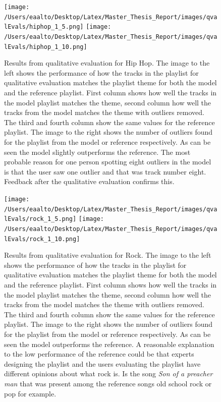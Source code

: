 \documentclass[a4paper,11pt]{kth-mag}
\begin{document}
\begin{figure}
\texttt{[image: /Users/eaalto/Desktop/Latex/Master\_Thesis\_Report/images/qvalEvals/hiphop\_1\_5.png]}
\texttt{[image: /Users/eaalto/Desktop/Latex/Master\_Thesis\_Report/images/qvalEvals/hiphop\_1\_10.png]}
\caption{Results from qualitative evaluation for Hip Hop. The image to the left shows the performance of how the tracks in the playlist for qualitative evaluation matches the playlist theme for both the model and the reference playlist. First column shows how well the tracks in the model playlist matches the theme, second column how well the tracks from the model matches the theme with outliers removed. The third and fourth column show the same values for the reference playlist. The image to the right shows the number of outliers found for the playlist from the model or reference respectively. As can be seen the model slightly outperforms the reference. The most probable reason for one person spotting eight outliers in the model is that the user saw one outlier and that was track number eight. Feedback after the qualitative evaluation confirms this.}
\end{figure}

\begin{figure}
\texttt{[image: /Users/eaalto/Desktop/Latex/Master\_Thesis\_Report/images/qvalEvals/rock\_1\_5.png]}
\texttt{[image: /Users/eaalto/Desktop/Latex/Master\_Thesis\_Report/images/qvalEvals/rock\_1\_10.png]}
\caption{Results from qualitative evaluation for Rock. The image to the left shows the performance of how the tracks in the playlist for qualitative evaluation matches the playlist theme for both the model and the reference playlist. First column shows how well the tracks in the model playlist matches the theme, second column how well the tracks from the model matches the theme with outliers removed. The third and fourth column show the same values for the reference playlist. The image to the right shows the number of outliers found for the playlist from the model or reference respectively. As can be seen the model outperforms the reference. A reasonable explanation to the low performance of the reference could be that experts designing the playlist and the users evaluating the playlist have different opinions about what rock is. Is the song \textit{Son of a preacher man} that was present among the reference songs old school rock or pop for example.}
\end{figure}
\end{document}
